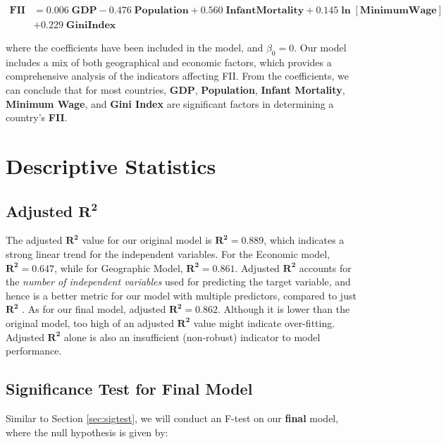 \documentclass{article}
\begin{document}
\begin{equation}\label{finalmodel}
    \begin{aligned}
        \mathbf{FII} &= 0.006\;\mathbf{GDP} - 0.476\;\mathbf{Population} + 0.560\;\mathbf{InfantMortality} + 0.145\bm{\ln{[\text{MinimumWage}]}} \\ &+ 0.229\;\mathbf{GiniIndex}
    \end{aligned}
\end{equation}

\noindent where the coefficients have been included in the model, and $\beta_0 = 0$. Our model includes a mix of both geographical and economic factors, which provides a comprehensive analysis of the indicators affecting FII. From the coefficients, we can conclude that for most countries, \textbf{GDP}, \textbf{Population}, \textbf{Infant Mortality}, \textbf{Minimum Wage}, and \textbf{Gini Index} are significant factors in determining a country's \textbf{FII}. 

\section{Descriptive Statistics}

\subsection{Adjusted $\bm{R^2}$}
The adjusted $\bm{R^2}$ value for our original model is $\bm{R^2 = 0.889}$, which indicates a strong linear trend for the independent variables. For the Economic model, $\bm{R^2 = 0.647}$, while for Geographic Model, $\bm{R^2 = 0.861}$. Adjusted $\bm{R^2}$ accounts for the \textit{number of independent variables} used for predicting the target variable, and hence is a better metric for our model with multiple predictors, compared to just $\bm{R^2}$ \cite{adjsutedrsquared}. As for our final model, adjusted $\bm{R^2 = 0.862}$. Although it is lower than the original model, too high of an adjusted $\bm{R^2}$ value might indicate over-fitting. Adjusted $\bm{R^2}$ alone is also an insufficient (non-robust) indicator to model performance.

\subsection{Significance Test for Final Model}
Similar to Section \ref{sec:sigtest}, we will conduct an F-test on our \textbf{final} model, where the null hypothesis is given by: 
\end{document}
